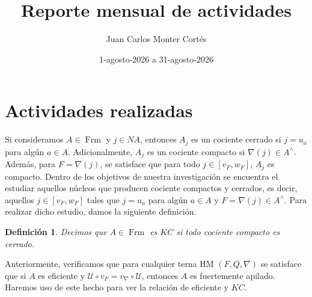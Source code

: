 \documentclass[12pt]{article}
\title{Reporte mensual de actividades}
\date{1-agosto-2026 a 31-agosto-2026}
\author{Juan Carlos Monter Cortés}
\newtheorem{dfn}[thm]{Definición}
\DeclareMathOperator{\Frm}{Frm}
\begin{document}
\maketitle

\section{Actividades realizadas}

Si consideramos $A\in \Frm$ y $j\in NA$, entonces $A_j$ es un cociente cerrado si $j=u_a$ para algún $a\in A$. Adicionalmente, $A_j$ es un cociente compacto si $\nabla(j)\in A^\wedge$. 
Además, para $F=\nabla(j)$, se satisface que para todo $j\in [v_F, w_F]$, $A_j$ es compacto. Dentro de los objetivos de nuestra investigación se encuentra el estudiar aquellos núcleos que producen 
cociente compactos y cerrados, es decir, aquellos $j\in [v_F, w_F]$ tales que $j=u_a$ para algún $a\in A$ y $F=\nabla(j)\in A^\wedge$. Para realizar dicho estudio, damos la siguiente definición.

\begin{dfn}\label{KC}
Decimos que $A\in \Frm$ es $KC$ si todo cociente compacto es cerrado.
\end{dfn}

Anteriormente, verificamos que para cualquier terna HM $(F, Q, \nabla)$ se satisface que si $A$ es eficiente y $\mathcal{U}\circ v_F=v_\nabla\circ \mathcal{U}$, entonces $A$ es fuertemente apilado.
Haremos uso de este hecho para ver la relación de eficiente y $KC$. 
\end{document}
